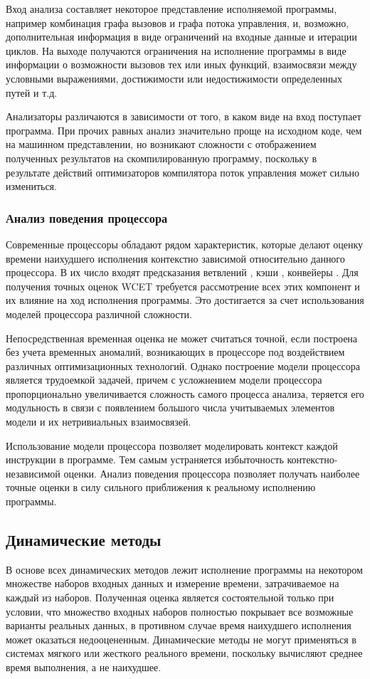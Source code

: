 \documentclass[12pt,a4paper]{article}
\begin{document}
Вход анализа составляет некоторое представление исполняемой программы, например комбинация графа вызовов и графа потока управления, и, возможно, дополнительная информация в виде ограничений на входные данные и итерации циклов. На выходе получаются ограничения на исполнение программы в виде информации о возможности вызовов тех или иных функций, взаимосвязи между условными выражениями, достижимости или недостижимости определенных путей и т.д.

Анализаторы различаются в зависимости от того, в каком виде на вход поступает программа. При прочих равных анализ значительно проще на исходном коде, чем на машинном представлении, но возникают сложности с отображением полученных результатов на скомпилированную программу, поскольку в результате действий оптимизаторов компилятора поток управления может сильно измениться.

\subsubsection{Анализ поведения процессора}
Современные процессоры обладают рядом характеристик, которые делают оценку времени наихудшего исполнения контекстно зависимой относительно данного процессора. В их число входят предсказания ветвлений \cite{branch}, кэши \cite{abs,cache}, конвейеры \cite{anom}. Для получения точных оценок WCET требуется рассмотрение всех этих компонент и их влияние на ход исполнения программы. Это достигается за счет использования моделей процессора различной сложности.

Непосредственная временная оценка не может считаться точной, если построена без учета временных аномалий, возникающих в процессоре под воздействием различных оптимизационных технологий. Однако построение модели процессора является трудоемкой задачей, причем с усложнением модели процессора пропорционально увеличивается сложность самого процесса анализа, теряется его модульность в связи с появлением большого числа учитываемых элементов модели и их нетривиальных взаимосвязей.

Использование модели процессора позволяет моделировать контекст каждой инструкции в программе. Тем самым устраняется избыточность контекстно-независимой оценки. 
Анализ поведения процессора позволяет получать наиболее точные оценки в силу сильного приближения к реальному исполнению программы.

\subsection{Динамические методы}
В основе всех динамических методов лежит исполнение программы на некотором множестве наборов входных данных и измерение времени, затрачиваемое на каждый из наборов. Полученная оценка является состоятельной только при условии, что множество входных наборов полностью покрывает все возможные варианты реальных данных, в противном случае время наихудшего исполнения может оказаться недооцененным. Динамические методы не могут применяться в системах мягкого или жесткого реального времени, поскольку вычисляют среднее время выполнения, а не наихудшее.
\end{document}
